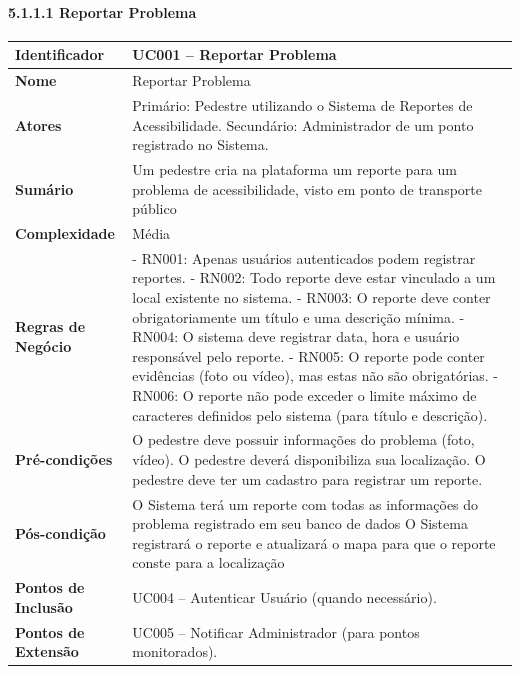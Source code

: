 \documentclass[12pt,a4paper]{article}
\begin{document}
\paragraph{5.1.1.1 Reportar Problema}

\begin{longtable}{|>{\raggedright\arraybackslash}p{3.5cm}|>{\raggedright\arraybackslash}p{10cm}|}
\hline
\textbf{Identificador} & UC001 – Reportar Problema \\
\hline
\textbf{Nome} & Reportar Problema \\
\hline
\textbf{Atores} & Primário: Pedestre utilizando o Sistema de Reportes de Acessibilidade. \newline Secundário: Administrador de um ponto registrado no Sistema. \\
\hline
\textbf{Sumário} & Um pedestre cria na plataforma um reporte para um problema de acessibilidade, visto em ponto de transporte público \\
\hline
\textbf{Complexidade} & Média \\
\hline
\textbf{Regras de Negócio} & - RN001: Apenas usuários autenticados podem registrar reportes. \newline - RN002: Todo reporte deve estar vinculado a um local existente no sistema. \newline - RN003: O reporte deve conter obrigatoriamente um título e uma descrição mínima. \newline - RN004: O sistema deve registrar data, hora e usuário responsável pelo reporte. \newline - RN005: O reporte pode conter evidências (foto ou vídeo), mas estas não são obrigatórias. \newline - RN006: O reporte não pode exceder o limite máximo de caracteres definidos pelo sistema (para título e descrição). \\
\hline
\textbf{Pré-condições} & O pedestre deve possuir informações do problema (foto, vídeo). \newline O pedestre deverá disponibiliza sua localização. \newline O pedestre deve ter um cadastro para registrar um reporte. \\
\hline
\textbf{Pós-condição} & O Sistema terá um reporte com todas as informações do problema registrado em seu banco de dados \newline O Sistema registrará o reporte e atualizará o mapa para que o reporte conste para a localização \\
\hline
\textbf{Pontos de Inclusão} & UC004 – Autenticar Usuário (quando necessário). \\
\hline
\textbf{Pontos de Extensão} & UC005 – Notificar Administrador (para pontos monitorados). \\
\hline
\end{longtable}
\end{document}

